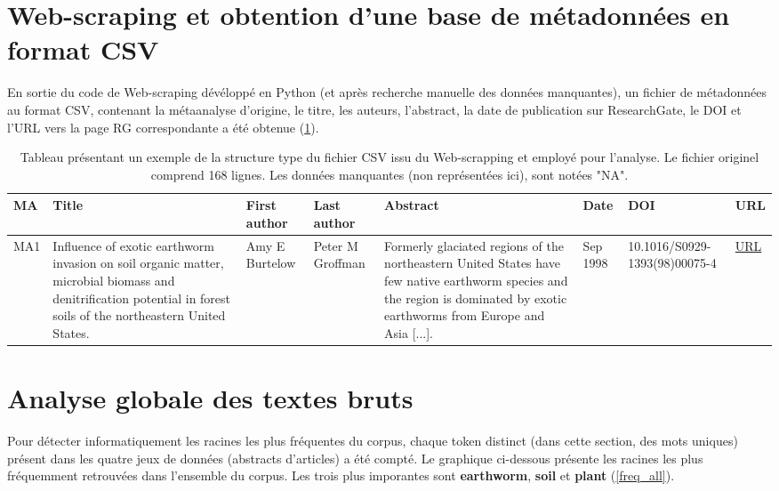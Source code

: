 \documentclass{book}
\begin{document}
\section{Web-scraping et obtention d'une base de métadonnées en format CSV}
\noindent
En sortie du code de Web-scraping dévéloppé en Python (et après recherche manuelle des données manquantes), un fichier de métadonnées au format CSV, contenant la métaanalyse d'origine, le titre, les auteurs, l'abstract, la date de publication sur ResearchGate, le DOI et l'URL vers la page RG correspondante a été obtenue (\cref{Table 1}). 
\begin{table}[H]
    \begin{tabular}{|p{0.7cm}|p{2cm}|p{1.5cm}|p{1.5cm}|p{3cm}|p{1.4cm}|p{2.1cm}|p{1cm}|}
      \hline
      \textbf{MA} & \textbf{Title} & \textbf{First author} & \textbf{Last author} & \textbf{Abstract} & \textbf{Date} & \textbf{DOI} & \textbf{URL} 
       \\
       \hline
      MA1 &
      Influence of exotic earthworm invasion on soil organic matter, microbial biomass and denitrification potential in forest soils of the northeastern United States. &
      Amy E Burtelow &
      Peter M Groffman &
      Formerly glaciated regions of the northeastern United States have few native earthworm species and the region is dominated by exotic earthworms from Europe and Asia [...]. &
      Sep 1998 &
      10.1016/S0929-1393(98)00075-4 &
      \href{https://www.researchgate.net/publication/222504320_Influence_of_exotic_earthworm_invasion_on_soil_organic_matter_microbial_biomass_and_denitrification_potential_in_forest_soils_of_the_northeastern_United_States?\_sg=Yv_a-THpFLD4vDUrl0rXvw4YNA6TBSRqNj_obWyLYzEIp3c_WKtxs7crdoVE05VQwdF5S5LHlSvHMqs}{URL}
       \\
       \hline
    \end{tabular}
    \caption[Table 1]{Tableau présentant un exemple de la structure type du fichier CSV issu du Web-scrapping et employé pour l'analyse. Le fichier originel comprend 168 lignes. Les données manquantes (non représentées ici), sont notées "NA".\label{Table 1}}
    \end{table}


\section{Analyse globale des textes bruts}
\noindent
Pour détecter informatiquement les racines les plus fréquentes du corpus, chaque token distinct (dans cette section, des mots uniques) présent dans les quatre jeux de données (abstracts d'articles) a été compté.  Le graphique ci-dessous présente les racines les plus fréquemment retrouvées dans l'ensemble du corpus. Les trois plus imporantes sont \textbf{earthworm}, \textbf{soil} et \textbf{plant} (\cref{freq_all}).
\end{document}

